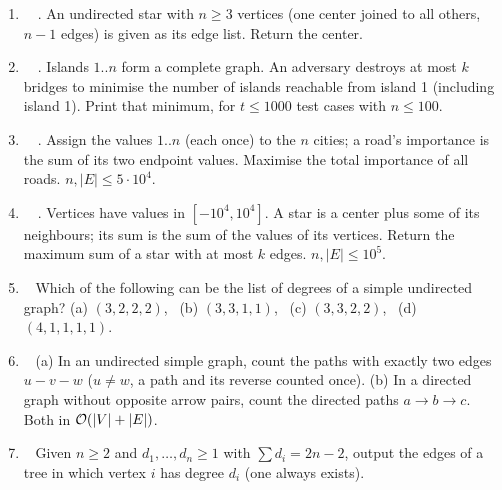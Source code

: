 \exlegend
\begin{enumerate}[leftmargin=*, label=\textbf{E1.\arabic*}, itemsep=6pt]
    \item \exeasy\ \pconcept {}\ . An undirected star with $n \ge 3$ vertices (one center joined to all others, $n-1$ edges) is given as its edge list. Return the center.
    \item \exeasy\ \precent {}\ . Islands $1..n$ form a complete graph. An adversary destroys at most $k$ bridges to minimise the number of islands reachable from island 1 (including island 1). Print that minimum, for $t \le 1000$ test cases with $n \le 100$.
    \item \exmedium\ \pconcept {}\ . Assign the values $1..n$ (each once) to the $n$ cities; a road's importance is the sum of its two endpoint values. Maximise the total importance of all roads. $n, |E| \le 5\cdot10^4$.
    \item \exmedium\ \ptricky {}\ . Vertices have values in $[-10^4, 10^4]$. A star is a center plus some of its neighbours; its sum is the sum of the values of its vertices. Return the maximum sum of a star with at most $k$ edges. $n, |E| \le 10^5$.
    \item \exeasy\ \ptricky {} Which of the following can be the list of degrees of a simple undirected graph? (a) $(3,2,2,2)$, \ (b) $(3,3,1,1)$, \ (c) $(3,3,2,2)$, \ (d) $(4,1,1,1,1)$.
    \item \exmedium\ \pconcept {} (a) In an undirected simple graph, count the paths with exactly two edges $u - v - w$ ($u \ne w$, a path and its reverse counted once). (b) In a directed graph without opposite arrow pairs, count the directed paths $a \to b \to c$. Both in $\mathcal{O}(|V|+|E|)$.
    \item \exmedium\ \pconcept {} Given $n \ge 2$ and $d_1,\dots,d_n \ge 1$ with $\sum d_i = 2n-2$, output the edges of a tree in which vertex $i$ has degree $d_i$ (one always exists).
\end{enumerate}

